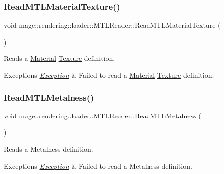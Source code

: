 \subsubsection{\texorpdfstring{Read\+M\+T\+L\+Material\+Texture()}{ReadMTLMaterialTexture()}}
{\footnotesize\ttfamily void mage\+::rendering\+::loader\+::\+M\+T\+L\+Reader\+::\+Read\+M\+T\+L\+Material\+Texture (\begin{DoxyParamCaption}{ }\end{DoxyParamCaption})\hspace{0.3cm}{\ttfamily [private]}}

Reads a \hyperlink{classmage_1_1rendering_1_1_material}{Material} \hyperlink{classmage_1_1rendering_1_1_texture}{Texture} definition.


\begin{DoxyExceptions}{Exceptions}
{\em \hyperlink{classmage_1_1_exception}{Exception}} & Failed to read a \hyperlink{classmage_1_1rendering_1_1_material}{Material} \hyperlink{classmage_1_1rendering_1_1_texture}{Texture} definition. \\
\hline
\end{DoxyExceptions}
\hypertarget{classmage_1_1rendering_1_1loader_1_1_m_t_l_reader_a14aa8cd5655730234c460c6060552f68}{}\label{classmage_1_1rendering_1_1loader_1_1_m_t_l_reader_a14aa8cd5655730234c460c6060552f68} 
\subsubsection{\texorpdfstring{Read\+M\+T\+L\+Metalness()}{ReadMTLMetalness()}}
{\footnotesize\ttfamily void mage\+::rendering\+::loader\+::\+M\+T\+L\+Reader\+::\+Read\+M\+T\+L\+Metalness (\begin{DoxyParamCaption}{ }\end{DoxyParamCaption})\hspace{0.3cm}{\ttfamily [private]}}

Reads a Metalness definition.


\begin{DoxyExceptions}{Exceptions}
{\em \hyperlink{classmage_1_1_exception}{Exception}} & Failed to read a Metalness definition. \\
\hline
\end{DoxyExceptions}
\hypertarget{classmage_1_1rendering_1_1loader_1_1_m_t_l_reader_afc25c8d259af6fbeb06a1e189f247e75}{}\label{classmage_1_1rendering_1_1loader_1_1_m_t_l_reader_afc25c8d259af6fbeb06a1e189f247e75} 

